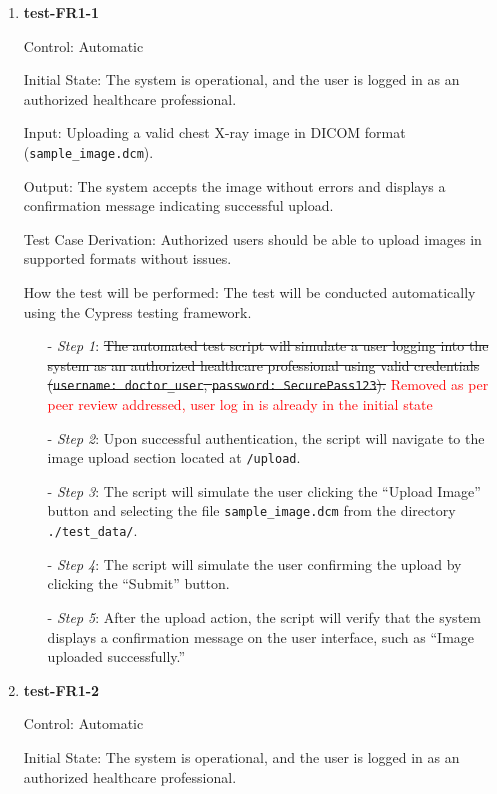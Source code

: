\documentclass[12pt, titlepage]{article}
\begin{document}
\begin{enumerate}

\item \textbf{test-FR1-1} \label{test-FR1-1}

Control: Automatic

Initial State: The system is operational, and the user is logged in as an authorized healthcare professional.

Input: Uploading a valid chest X-ray image in DICOM format (\texttt{sample\_image.dcm}).

Output: The system accepts the image without errors and displays a confirmation message indicating successful upload.

Test Case Derivation: Authorized users should be able to upload images in supported formats without issues.

How the test will be performed: The test will be conducted automatically using the Cypress testing framework.
\begin{itemize}
  \item[-] \textit{Step 1}: \sout{The automated test script will simulate a user logging into the system as an authorized healthcare professional using valid credentials (\texttt{username: doctor\_user}, \texttt{password: SecurePass123}).}
  \textcolor{red}{Removed as per peer review addressed, user log in is already in the initial state }
  \item[-] \textit{Step 2}: Upon successful authentication, the script will navigate to the image upload section located at \texttt{/upload}.
  \item[-] \textit{Step 3}: The script will simulate the user clicking the ``Upload Image'' button and selecting the file \texttt{sample\_image.dcm} from the directory \texttt{./test\_data/}.
  \item[-] \textit{Step 4}: The script will simulate the user confirming the upload by clicking the ``Submit'' button.
  \item[-] \textit{Step 5}: After the upload action, the script will verify that the system displays a confirmation message on the user interface, such as ``Image uploaded successfully.''
  \end{itemize}


\item \textbf{test-FR1-2} \label{test-FR1-2}

Control: Automatic

Initial State: The system is operational, and the user is logged in as an authorized healthcare professional.


\end{enumerate}
\end{document}
